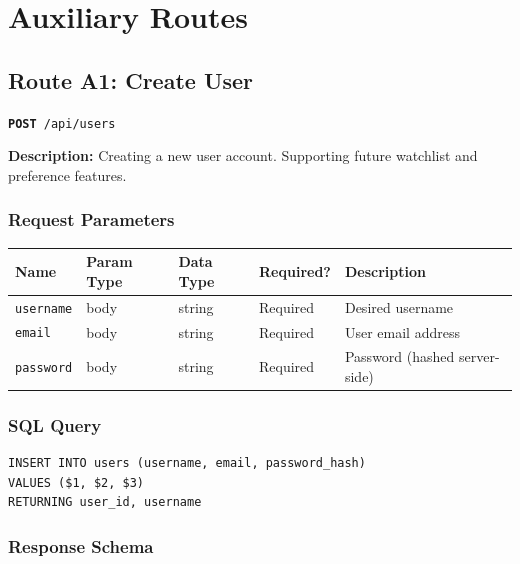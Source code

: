 \documentclass[11pt]{article}
\newcommand{\route}[2]{\texttt{\textcolor{routecolor}{\textbf{#1}}~#2}}
\begin{document}
\newpage
\section{Auxiliary Routes}

\subsection{Route A1: Create User}

\route{POST}{/api/users}

\medskip\noindent
\textbf{Description:} Creating a new user account. Supporting future watchlist and preference features.

\subsubsection*{Request Parameters}

\begin{center}
\small
\begin{tabular}{l l l l p{5cm}}
\toprule
\textbf{Name} & \textbf{Param Type} & \textbf{Data Type} & \textbf{Required?} & \textbf{Description} \\
\midrule
\texttt{username} & body & string & Required & Desired username \\
\texttt{email}    & body & string & Required & User email address \\
\texttt{password} & body & string & Required & Password (hashed server-side) \\
\bottomrule
\end{tabular}
\end{center}

\subsubsection*{SQL Query}
\begin{lstlisting}[style=sql,basicstyle=\ttfamily\scriptsize]
INSERT INTO users (username, email, password_hash)
VALUES ($1, $2, $3)
RETURNING user_id, username
\end{lstlisting}

\subsubsection*{Response Schema}
\end{document}
